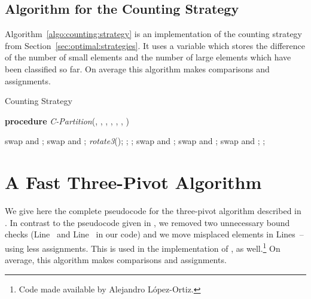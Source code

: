 \documentclass[prodmode,acmtalg]{acmsmall}
\begin{document}
            \subsection{Algorithm for the Counting Strategy}
            \label{app:sec:algo:counting:strategy}
            Algorithm~\ref{algo:counting:strategy} is an implementation
            of the counting strategy from Section~\ref{sec:optimal:strategies}. 
            It uses a variable  which stores the difference of
            the number of small elements and the number of large elements
            which have been classified so far.  On average this algorithm makes
             comparisons and  assignments.
\begin{algorithm}
    \caption{Counting Strategy }\samepage\label{algo:counting:strategy}
    \textbf{procedure} \textit{C-Partition}(,
		, , ,
		, , )
    \begin{algorithmic}[1]
        \State 
        \State  {}
        \While{}
            \If{}
                \If{}
                    \State swap  and ;
                    \State 
                \Else
                    \If{}
                        \State 
                    \Else
                        \State swap  and ;
                        \State 
                    \EndIf
                \EndIf
            \Else
                \While{}
                    \State 
                \EndWhile
                \If{}
                    \If{}
                        \State \emph{rotate3}();
                        \State ;
                         ;
                    \Else
                        \State swap  and ;
                    \EndIf
                    \State 
                \EndIf
            \EndIf
        \EndWhile
        \State swap  and ;
        \State swap  and ;
        \State ;
    \end{algorithmic}
\end{algorithm}

\section{A Fast Three-Pivot Algorithm}\label{app:sec:algo:three:pivot}
We give here the complete pseudocode for the three-pivot algorithm described in \cite{Kushagra14}. 
In contrast to the pseudocode given in \cite[Algorithm A.1.1]{Kushagra14}, we removed two unnecessary
bound checks (Line~ and Line~ in our code) and we move misplaced elements
in Lines~-- using less assignments. This is used in the implementation
of \cite{Kushagra14}, as well.\footnote{Code made available by Alejandro
L{\'o}pez-Ortiz.} On average, this algorithm makes 
comparisons 
and  assignments. 
\end{document}
